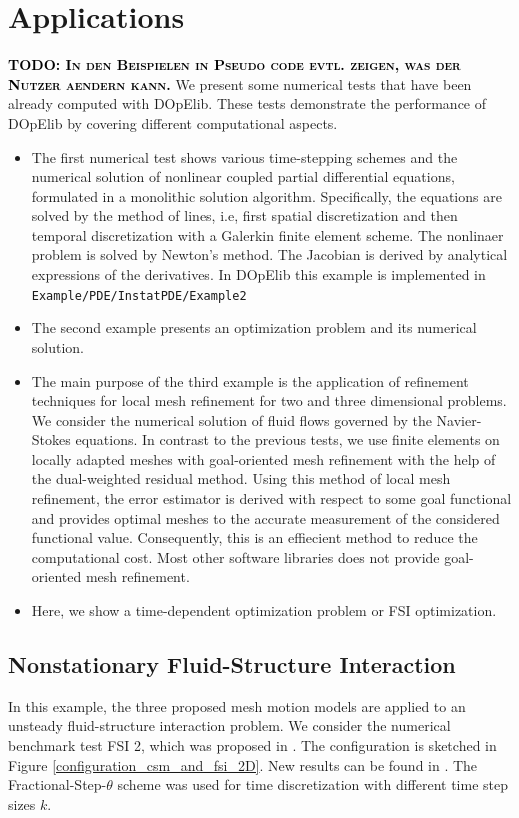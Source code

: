 \documentclass[prodmode,acmtoms]{acmsmall}
\numberwithin{equation}{section}
\newcommand{\todo}[1]{\textbf{\textsc{\textcolor{black}{TODO: #1}}}}
\begin{document}
\section{Applications}
\label{applications}
\todo{In den Beispielen in Pseudo code evtl. zeigen, was der 
Nutzer aendern kann.}
We present some numerical tests that have been already computed 
with DOpElib. These tests demonstrate the performance 
of DOpElib by covering different computational aspects. 
\begin{itemize}
\item The first numerical test shows various time-stepping schemes
and the numerical solution of nonlinear coupled partial differential
equations, formulated in a monolithic solution algorithm. 
Specifically, the equations are solved by the method of lines, i.e,
first spatial discretization and then temporal  discretization 
with a Galerkin finite element scheme. The nonlinaer problem
is solved by Newton's method. The Jacobian is derived 
by analytical expressions of the derivatives. 
In DOpElib this example is implemented in 
\texttt{Example/PDE/InstatPDE/Example2}
\item The second example presents an
optimization problem and its numerical solution.
\item The main purpose of the third example is the application 
of refinement techniques for local mesh refinement for 
two and three dimensional problems. We consider the numerical
solution of fluid flows governed by the Navier-Stokes
equations. In contrast to the previous tests, we 
use finite elements on locally adapted meshes 
with goal-oriented mesh refinement with the help
of the dual-weighted residual method. Using 
this method of local mesh refinement, the error estimator
is derived with respect to some goal functional and 
provides optimal meshes to the accurate measurement 
of the considered functional value. Consequently,
this is an effiecient method to reduce the computational 
cost. Most other 
software libraries does not provide goal-oriented 
mesh refinement.  
\item Here, we show a time-dependent optimization problem or 
FSI optimization. 
\end{itemize}


\subsection{Nonstationary Fluid-Structure Interaction}
In this example, the three proposed mesh motion models are applied 
to an unsteady fluid-structure interaction problem. We consider 
the numerical benchmark test FSI 2, which was proposed in \cite{HrTu06b}. 
The configuration is 
sketched in Figure \ref{configuration_csm_and_fsi_2D}.
New results can be found in \cite{BuSc06, TuHrMaRaWoAc10, DeHaeAnnBrVie10}. 
The Fractional-Step-$\theta$ scheme was used for time discretization with
different time step sizes $k$. 
\end{document}
